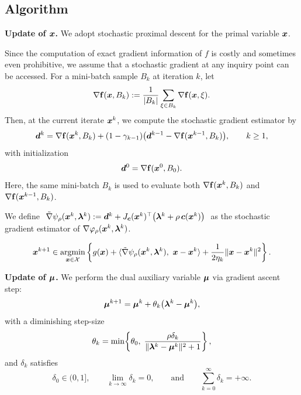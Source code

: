 \documentclass[10pt]{article}
\begin{document}
\subsection{Algorithm}
\textbf{Update of $\bm{x}$.} We adopt stochastic proximal descent for the primal variable $\bm{x}$.


Since the computation of exact gradient information of $f$ is costly and sometimes even prohibitive, we assume that a stochastic gradient at any inquiry point can be accessed. For a mini-batch sample $B_k$ at iteration $k$, let
\[
\nabla \mathbf{f}(\bm{x},B_k)
:=
\frac{1}{|B_k|}\sum_{\xi \in B_k} \nabla \mathbf{f}(\bm{x},\xi).
\]
Then, at the current iterate $\bm{x}^k$, we compute the stochastic gradient estimator by
\begin{equation}\label{eq:storm}
    \bm{d}^k
    =
    \nabla \mathbf{f}(\bm{x}^k, B_k)
    + (1-\gamma_{k-1})
    \big(
        \bm{d}^{k-1}
        - \nabla \mathbf{f}(\bm{x}^{k-1}, B_k)
    \big),
    \qquad k \geq 1,
\end{equation}
with initialization
\begin{equation}\label{eq:storm-init}
    \bm{d}^0 = \nabla \mathbf{f}(\bm{x}^0,B_0).
\end{equation}
Here, the same mini-batch $B_k$ is used to evaluate both
$\nabla \mathbf{f}(\bm{x}^k,B_k)$ and
$\nabla \mathbf{f}(\bm{x}^{k-1},B_k)$.

We define \(\ \tilde{\nabla} \psi_{\rho}(\bm{x}^k, \bm{\lambda}^k) := \bm{d}^k + J_{\bm{c}}(\bm{x}^k)^\top\!\left(\bm{\lambda}^k + \rho\,\bm{c}(\bm{x}^k)\right)\ \) as the stochastic gradient estimator of $\nabla \varphi_{\rho}(\bm{x}^k, \bm{\lambda}^k)$.    

\begin{equation}\label{eq:x-update}
\bm{x}^{k+1} \in \operatorname*{\mathrm{argmin}}_{\bm{x} \in \mathcal{X}}
\left\{
g(\bm{x}) + \langle \tilde{\nabla} \psi_{\rho}(\bm{x}^k, \bm{\lambda}^k),\ \bm{x} - \bm{x}^k \rangle + \frac{1}{2\eta_k}\|\bm{x} - \bm{x}^k\|^2
\right\}.
\end{equation}

\textbf{Update of $\bm{\mu}$.} We perform the dual auxiliary variable $\bm{\mu}$ via gradient ascent step:
\begin{equation}\label{eq:mu-update}
    \bm{\mu}^{k+1} = \bm{\mu}^k + \theta_k\big(\bm{\lambda}^k - \bm{\mu}^k\big),
\end{equation} with a diminishing step-size
\begin{equation}\label{eq:theta-def}
    \theta_k = \min\!\left\{\theta_0,\; 
    \frac{\rho\delta_k}{\|\bm{\lambda}^k - \bm{\mu}^k\|^2 + 1}\right\},
\end{equation} and \(\delta_k \) satisfies
\begin{equation}\label{eq:delta-conditions}
    \delta_0 \in (0,1], \qquad 
    \lim_{k\to\infty} \delta_k = 0, \qquad \text{and} \qquad
    \sum_{k=0}^{\infty} \delta_k = +\infty.
\end{equation}
\end{document}
